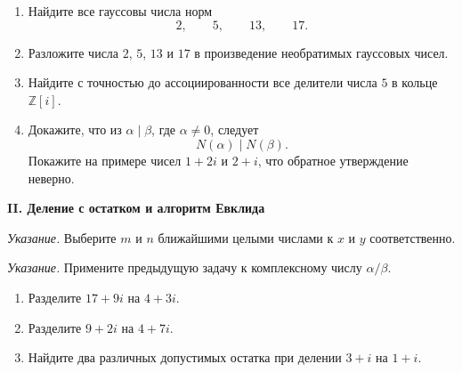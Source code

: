 \medskip


\begin{enumerate}[label=\textbf{\alph*)}, leftmargin=8mm]
    \item Найдите все гауссовы числа норм
    \[
        2,\qquad 5,\qquad 13,\qquad 17.
    \]

    \item Разложите числа $2$, $5$, $13$ и $17$ в произведение
    необратимых гауссовых чисел.

    \item Найдите с точностью до ассоциированности все делители числа
    $5$ в кольце $\mathbb Z[i]$.

    \item Докажите, что из $\alpha\mid\beta$, где $\alpha\ne0$, следует
    \[
        N(\alpha)\mid N(\beta).
    \]
    Покажите на примере чисел $1+2i$ и $2+i$, что обратное утверждение
    неверно.
\end{enumerate}

\begin{center}
    {\large\bfseries II. Деление с остатком и алгоритм Евклида}
\end{center}


\textit{Указание.} Выберите $m$ и $n$ ближайшими целыми числами к
$x$ и $y$ соответственно.

\medskip


\textit{Указание.} Примените предыдущую задачу к комплексному числу
$\alpha/\beta$.

\medskip


\begin{enumerate}[label=\textbf{\alph*)}, leftmargin=8mm]
    \item Разделите $17+9i$ на $4+3i$.

    \item Разделите $9+2i$ на $4+7i$.

    \item Найдите два различных допустимых остатка при делении
    $3+i$ на $1+i$.
\end{enumerate}

